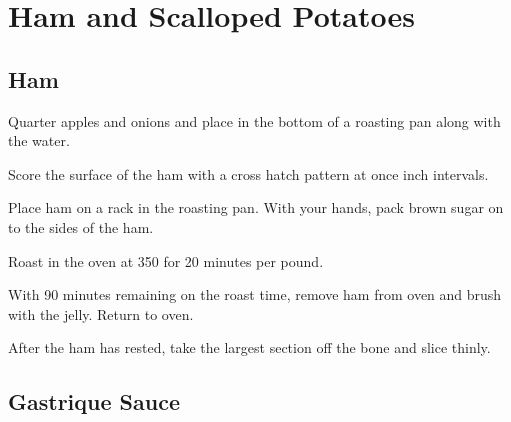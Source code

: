 
\section{Ham and Scalloped Potatoes}
\begin{recipe}


\subsection{Ham}



Quarter apples and onions and place in the bottom of a roasting pan along with the water.

Score the surface of the ham with a cross hatch pattern at once inch intervals.

Place ham on a rack in the roasting pan. With your hands, pack brown sugar on to the sides of the ham.

Roast in the oven at 350\degree{} for 20 minutes per pound.


With 90 minutes remaining on the roast time, remove ham from oven and brush with the jelly. Return to oven.

After the ham has rested, take the largest section off the bone and slice thinly.

\subsection{Gastrique Sauce}



\end{recipe}
